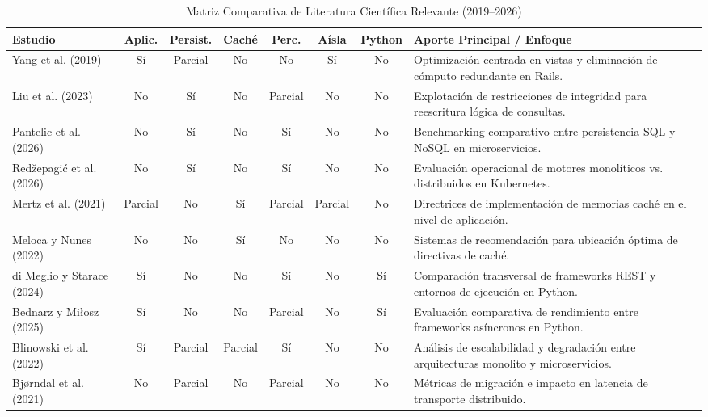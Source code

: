 \documentclass[conference]{IEEEtran}
\begin{document}
\begin{table}[!t]
\centering
\caption{Matriz Comparativa de Literatura Científica Relevante (2019--2026)}
\label{tab:matriz_literatura}
\scriptsize
\setlength{\tabcolsep}{3.0pt}
\begin{tabularx}{\textwidth}{|>{\raggedright\arraybackslash}p{2.8cm}|c|c|c|c|c|c|X|}
\hline
\textbf{Estudio} & \textbf{Aplic.} & \textbf{Persist.} & \textbf{Caché} & \textbf{Perc.} & \textbf{Aísla} & \textbf{Python} & \textbf{Aporte Principal / Enfoque} \\
\hline
Yang et al. (2019) \cite{Yang2019} & Sí & Parcial & No & No & Sí & No & Optimización centrada en vistas y eliminación de cómputo redundante en Rails. \\
\hline
Liu et al. (2023) \cite{Liu2023} & No & Sí & No & Parcial & No & No & Explotación de restricciones de integridad para reescritura lógica de consultas. \\
\hline
Pantelic et al. (2026) \cite{Pantelic2026} & No & Sí & No & Sí & No & No & Benchmarking comparativo entre persistencia SQL y NoSQL en microservicios. \\
\hline
Redžepagić et al. (2026) \cite{Redzepagic2026} & No & Sí & No & Sí & No & No & Evaluación operacional de motores monolíticos vs. distribuidos en Kubernetes. \\
\hline
Mertz et al. (2021) \cite{Mertz2021} & Parcial & No & Sí & Parcial & Parcial & No & Directrices de implementación de memorias caché en el nivel de aplicación. \\
\hline
Meloca y Nunes (2022) \cite{Meloca2022} & No & No & Sí & No & No & No & Sistemas de recomendación para ubicación óptima de directivas de caché. \\
\hline
di Meglio y Starace (2024) \cite{diMeglio2024} & Sí & No & No & Sí & No & Sí & Comparación transversal de frameworks REST y entornos de ejecución en Python. \\
\hline
Bednarz y Miłosz (2025) \cite{Bednarz2025} & Sí & No & No & Parcial & No & Sí & Evaluación comparativa de rendimiento entre frameworks asíncronos en Python. \\
\hline
Blinowski et al. (2022) \cite{Blinowski2022} & Sí & Parcial & Parcial & Sí & No & No & Análisis de escalabilidad y degradación entre arquitecturas monolito y microservicios. \\
\hline
Bjørndal et al. (2021) \cite{Bjorndal2021} & No & Parcial & No & Parcial & No & No & Métricas de migración e impacto en latencia de transporte distribuido. \\

\end{tabularx}
\end{table}
\end{document}
